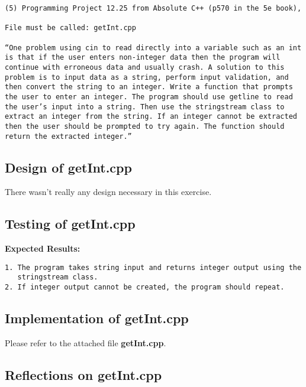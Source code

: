 \documentclass[11pt, oneside]{memoir}
\begin{document}
\begin{verbatim}
(5) Programming Project 12.25 from Absolute C++ (p570 in the 5e book),

File must be called: getInt.cpp

“One problem using cin to read directly into a variable such as an int
is that if the user enters non-integer data then the program will
continue with erroneous data and usually crash. A solution to this
problem is to input data as a string, perform input validation, and
then convert the string to an integer. Write a function that prompts
the user to enter an integer. The program should use getline to read
the user’s input into a string. Then use the stringstream class to
extract an integer from the string. If an integer cannot be extracted
then the user should be prompted to try again. The function should
return the extracted integer.” 
\end{verbatim}

\subsection{Design of getInt.cpp}
There wasn't really any design necessary in this exercise.


\subsection{Testing of getInt.cpp}

\textbf{Expected Results:}\\
\begin{verbatim}
1. The program takes string input and returns integer output using the 
   stringstream class. 
2. If integer output cannot be created, the program should repeat.
\end{verbatim}


\subsection{Implementation of getInt.cpp}
% 

Please refer to the attached file \textbf{getInt.cpp}.

\subsection{Reflections on getInt.cpp}
\end{document}

